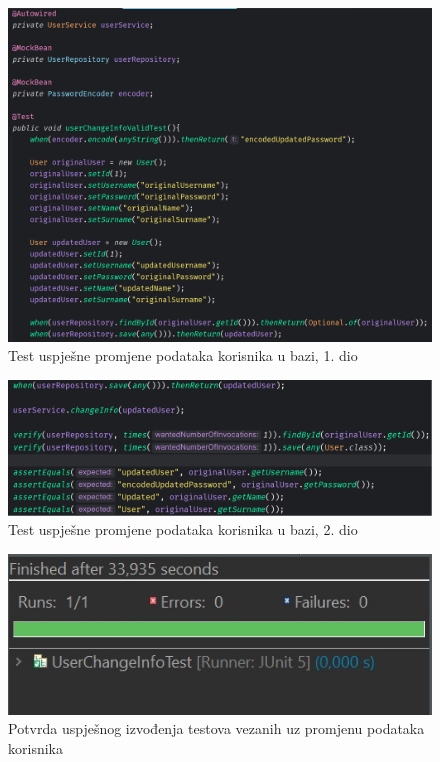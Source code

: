 			\begin{figure}[H]
			\includegraphics[scale=0.4]{slike/userChangeInfoValidTest1.PNG} %
			\centering
			\caption{Test uspješne promjene podataka korisnika u bazi, 1. dio}
			\label{Test uspješne promjene podataka korisnika u bazi, 1. dio}
		\end{figure}
		
								\begin{figure}[H]
			\includegraphics[scale=0.4]{slike/userChangeInfoValidTest2.PNG} %
			\centering
			\caption{Test uspješne promjene podataka korisnika u bazi, 2. dio}
			\label{Test uspješne promjene podataka korisnika u bazi, 2. dio}
		\end{figure}
		
		\begin{figure}[H]
			\includegraphics[scale=0.4]{slike/JUnit_change.JPG} %
			\centering
			\caption{Potvrda uspješnog izvođenja testova vezanih uz promjenu podataka korisnika}
			\label{Potvrda uspješnog izvođenja testova vezanih uz promjenu podataka korisnika}
		\end{figure}

